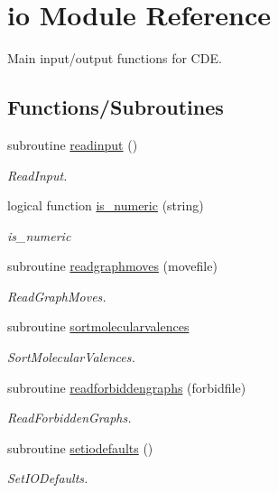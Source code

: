 \hypertarget{namespaceio}{}\section{io Module Reference}
\label{namespaceio}


Main input/output functions for C\+DE.  


\subsection*{Functions/\+Subroutines}
\begin{DoxyCompactItemize}
\item 
subroutine \mbox{\hyperlink{namespaceio_aee45b0da5539969779855687cc9efd6d}{readinput}} ()
\begin{DoxyCompactList}\small\item\em Read\+Input. \end{DoxyCompactList}\item 
logical function \mbox{\hyperlink{namespaceio_a386a5703d972e990643b637ef0bd8d58}{is\+\_\+numeric}} (string)
\begin{DoxyCompactList}\small\item\em is\+\_\+numeric \end{DoxyCompactList}\item 
subroutine \mbox{\hyperlink{namespaceio_a19211eac027eb30d7c602fb5583351e0}{readgraphmoves}} (movefile)
\begin{DoxyCompactList}\small\item\em Read\+Graph\+Moves. \end{DoxyCompactList}\item 
subroutine \mbox{\hyperlink{namespaceio_a0de73eea344ac9978f7cbb7d80c6ab2c}{sortmolecularvalences}}
\begin{DoxyCompactList}\small\item\em Sort\+Molecular\+Valences. \end{DoxyCompactList}\item 
subroutine \mbox{\hyperlink{namespaceio_a2f1df2054a4fbfd76d2351f26f6b4b02}{readforbiddengraphs}} (forbidfile)
\begin{DoxyCompactList}\small\item\em Read\+Forbidden\+Graphs. \end{DoxyCompactList}\item 
subroutine \mbox{\hyperlink{namespaceio_aea679911d5618f57aaa7a3daa238ec13}{setiodefaults}} ()
\begin{DoxyCompactList}\small\item\em Set\+I\+O\+Defaults. \end{DoxyCompactList}\end{DoxyCompactItemize}


